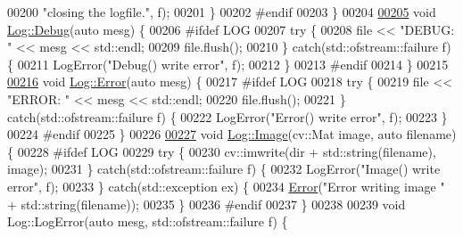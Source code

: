 \begin{DoxyCode}
00200                     \textcolor{stringliteral}{"closing the logfile."}, f);
00201         \}
00202 \textcolor{preprocessor}{#endif}
00203     \}
00204 
\hypertarget{Log_8hpp_source_l00205}{}\hyperlink{classChipChipArray_1_1Log_ac32b435af1577e4ebc67af2bdfea8eff}{00205}     \textcolor{keywordtype}{void} \hyperlink{classChipChipArray_1_1Log_ac32b435af1577e4ebc67af2bdfea8eff}{Log::Debug}(\textcolor{keyword}{auto} mesg) \{
00206 \textcolor{preprocessor}{#ifdef LOG}
00207         \textcolor{keywordflow}{try} \{
00208             file << \textcolor{stringliteral}{"DEBUG: "} << mesg << std::endl;
00209             file.flush();
00210         \} \textcolor{keywordflow}{catch}(std::ofstream::failure f) \{
00211             LogError(\textcolor{stringliteral}{"Debug() write error"}, f);
00212         \}
00213 \textcolor{preprocessor}{#endif}
00214     \}
00215 
\hypertarget{Log_8hpp_source_l00216}{}\hyperlink{classChipChipArray_1_1Log_aba7b7b0555f49f4dcf15f4b9fd3e6b34}{00216}     \textcolor{keywordtype}{void} \hyperlink{classChipChipArray_1_1Log_aba7b7b0555f49f4dcf15f4b9fd3e6b34}{Log::Error}(\textcolor{keyword}{auto} mesg) \{
00217 \textcolor{preprocessor}{#ifdef LOG}
00218         \textcolor{keywordflow}{try} \{
00219             file << \textcolor{stringliteral}{"ERROR: "} << mesg << std::endl;
00220             file.flush();
00221         \} \textcolor{keywordflow}{catch}(std::ofstream::failure f) \{
00222             LogError(\textcolor{stringliteral}{"Error() write error"}, f);
00223         \}
00224 \textcolor{preprocessor}{#endif}
00225     \}
00226 
\hypertarget{Log_8hpp_source_l00227}{}\hyperlink{classChipChipArray_1_1Log_a65bbab057c8b1453f9e4efcfee7522c4}{00227}     \textcolor{keywordtype}{void} \hyperlink{classChipChipArray_1_1Log_a65bbab057c8b1453f9e4efcfee7522c4}{Log::Image}(cv::Mat image, \textcolor{keyword}{auto} filename) \{
00228 \textcolor{preprocessor}{#ifdef LOG}
00229         \textcolor{keywordflow}{try} \{
00230             cv::imwrite(dir + std::string(filename), image);
00231         \} \textcolor{keywordflow}{catch}(std::ofstream::failure f) \{
00232             LogError(\textcolor{stringliteral}{"Image() write error"}, f);
00233         \} \textcolor{keywordflow}{catch}(std::exception ex) \{
00234             \hyperlink{classChipChipArray_1_1Log_aba7b7b0555f49f4dcf15f4b9fd3e6b34}{Error}(\textcolor{stringliteral}{"Error writing image "} + std::string(filename));
00235         \}
00236 \textcolor{preprocessor}{#endif}
00237     \}
00238 
00239     \textcolor{keywordtype}{void} Log::LogError(\textcolor{keyword}{auto} mesg, std::ofstream::failure f) \{

\end{DoxyCode}
